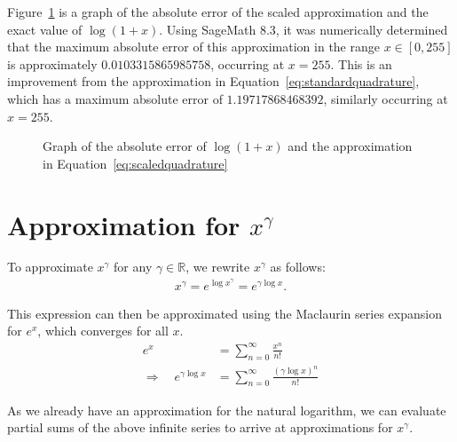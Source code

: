 Figure~\ref{fig:scaledquadrature} is a graph of the absolute error of the scaled approximation and the exact value of $\log{(1+x)}$. Using SageMath 8.3, it was numerically determined that the maximum absolute error of this approximation in the range $x\in[0,255]$ is approximately $0.0103315865985758$, occurring at $x=255$. This is an improvement from the approximation in Equation~\ref{eq:standardquadrature}, which has a maximum absolute error of $1.19717868468392$, similarly occurring at $x=255$.

\begin{figure}[h]
    \centering
    \caption{Graph of the absolute error of $\log{(1+x)}$ and the approximation in Equation~\ref{eq:scaledquadrature}}
    \label{fig:scaledquadrature}
\end{figure}

\section{Approximation for $x^\gamma$}
\label{sec:approx-pwr}
To approximate $x^\gamma$ for any $\gamma \in \mathbb{R}$, we rewrite $x^\gamma$ as follows:
\begin{align*}
  x^\gamma = e^{\log{x^\gamma}} = e^{\gamma\log{x}}.
\end{align*}

This expression can then be approximated using the Maclaurin series expansion for $e^x$, which converges for all $x$.
\begin{align*}
  e^x &= \sum_{n=0}^{\infty}{\frac{x^n}{n!}}\\
  \Rightarrow \quad e^{\gamma\log{x}} &= \sum_{n=0}^{\infty}{\frac{(\gamma\log{x})^n}{n!}}
\end{align*}

As we already have an approximation for the natural logarithm, we can evaluate partial sums of the above infinite series to arrive at approximations for $x^\gamma$.